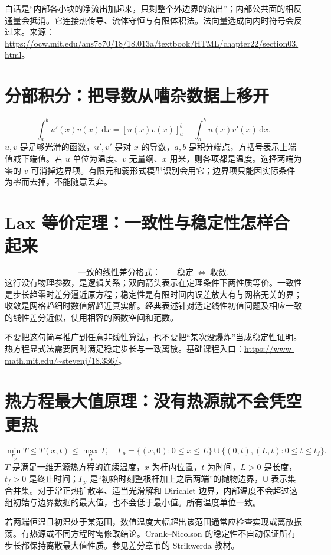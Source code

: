 白话是“内部各小块的净流出加起来，只剩整个外边界的流出”；内部公共面的相反通量会抵消。它连接热传导、流体守恒与有限体积法。法向量选成向内时符号会反过来。来源：\url{https://ocw.mit.edu/ans7870/18/18.013a/textbook/HTML/chapter22/section03.html}。

\section{分部积分：把导数从嘈杂数据上移开}
\begin{equation}\int_a^b u'(x)v(x)\,\mathrm dx=[u(x)v(x)]_a^b-\int_a^b u(x)v'(x)\,\mathrm dx.\end{equation}
$u,v$ 是足够光滑的函数，$u',v'$ 是对 $x$ 的导数，$a,b$ 是积分端点，方括号表示上端值减下端值。若 $u$ 单位为温度、$v$ 无量纲、$x$ 用米，则各项都是温度。选择两端为零的 $v$ 可消掉边界项。有限元和弱形式模型识别会用它；边界项只能因实际条件为零而去掉，不能随意丢弃。

\section{Lax 等价定理：一致性与稳定性怎样合起来}
\begin{equation}\text{一致的线性差分格式：}\qquad \text{稳定}\ \Longleftrightarrow\ \text{收敛}.\end{equation}
这行没有物理参数，是逻辑关系；双向箭头表示在定理条件下两性质等价。一致性是步长趋零时差分逼近原方程；稳定性是有限时间内误差放大有与网格无关的界；收敛是网格趋细时数值解趋近真实解。经典表述针对适定线性初值问题及相应一致的线性差分近似，使用相容的函数空间和范数。

不要把这句简写推广到任意非线性算法，也不要把“某次没爆炸”当成稳定性证明。热方程显式法需要同时满足稳定步长与一致离散。基础课程入口：\url{https://www-math.mit.edu/~stevenj/18.336/}。

\section{热方程最大值原理：没有热源就不会凭空更热}
\begin{equation}\min_{\Gamma_p}T\le T(x,t)\le\max_{\Gamma_p}T,\quad \Gamma_p=\{(x,0):0\le x\le L\}\cup\{(0,t),(L,t):0\le t\le t_f\}.\end{equation}
$T$ 是满足一维无源热方程的连续温度，$x$ 为杆内位置，$t$ 为时间，$L>0$ 是长度，$t_f>0$ 是终止时间；$\Gamma_p$ 是“初始时刻整根杆加上之后两端”的抛物边界，$\cup$ 表示集合并集。对于常正热扩散率、适当光滑解和 Dirichlet 边界，内部温度不会超过这组初始与边界数据的最大值，也不会低于最小值。所有温度单位一致。

若两端恒温且初温处于某范围，数值温度大幅超出该范围通常应检查实现或离散振荡。有热源或不同方程时需修改结论。Crank--Nicolson 的稳定性不自动保证所有步长都保持离散最大值性质。参见差分章节的 Strikwerda 教材。
